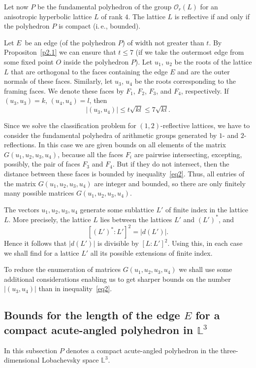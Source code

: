 \documentclass[reqno,12pt]{amsart}
\begin{document}
Let now $P$ be the fundamental polyhedron of the group
$\mathcal{O}_r(L)$ for an anisotropic hyperbolic lattice $L$
of rank $4$. The lattice $L$ is reflective if and only if the polyhedron
$P$ is compact (i.\,e., bounded).

Let $E$~be an edge (of the polyhedron $P$) of width not greater than $t$. By
Propositon~\ref{p2.1} we can ensure that $t \leq 7$ (if we take the outermost
edge from some fixed point $O$ inside the polyhedron $P$). Let $u_1$, $u_2$
be the roots of the lattice $L$ that are orthogonal to the faces containing
the edge $E$ and are the outer normals of these faces.
Similarly, let $u_3$, $u_4$ be the roots corresponding to the framing
faces. We denote these faces
by $F_1$, $F_2$, $F_3$, and $F_4$, respectively. If $(u_3, u_3) = k$, $(u_4, u_4) = l$, then
\begin{equation}
\label{eq2}
|(u_3, u_4)| \leq t\sqrt{kl} \leq 7 \sqrt{kl}.
\end{equation}


Since we solve the classification problem for $(1{,}2)$-reflective lattices,
we have to consider the fundamental polyhedra of arithmetic
groups generated by $1$- and $2$-reflections. In this case we are given bounds
on all elements of the matrix $G(u_1, u_2, u_3, u_4)$,
because all the faces $F_i$ are pairwise intersecting, excepting,
possibly, the pair of faces $F_3$ and $F_4$. But if they do not intersect,
then the distance between
these faces is bounded by inequality~\eqref{eq2}.
Thus, all entries of the matrix $G(u_1, u_2, u_3, u_4)$ are integer and bounded, so
there are only finitely many possible matrices
$G(u_1, u_2, u_3, u_4)$.


The vectors $u_1, u_2, u_3, u_4$ generate some sublattice $L '$
of finite index in the lattice $L$. More precisely, the lattice $ L $ lies between
the lattices $L'$ and $(L')^*$, and
$$
[(L')^* : L']^2=|d(L')|.
$$
Hence it follows that $|d(L')|$ is divisible by $[L:L']^2$. Using this, in each case we shall
find  for a lattice
$L'$ all its possible extensions of finite index.

To reduce the enumeration of matrices $G(u_1, u_2, u_3, u_4)$ we shall use some
additional considerations enabling us to get sharper
bounds on the number $|(u_3, u_4)|$ than in inequality~\eqref{eq2}.


\subsection{Bounds for the length of the edge
$E$ for a compact acute-angled polyhedron in $\mathbb{L}^3$}
\label{ss2.3}
In this subsection $P$ denotes a compact acute-angled polyhedron in the three-dimensional
Lobachevsky space $\mathbb{L}^3$.
\end{document}
